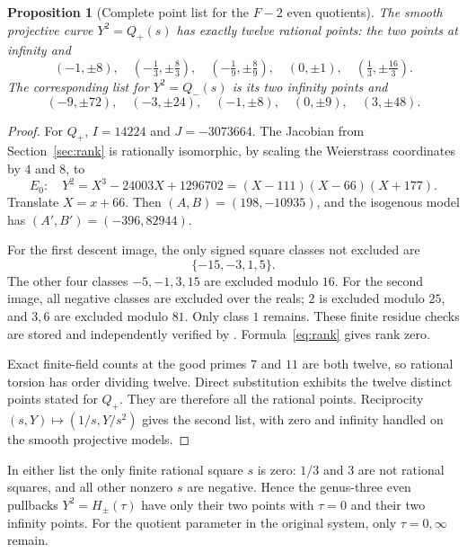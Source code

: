 \documentclass[11pt,letterpaper]{article}
\newtheorem{proposition}[theorem]{Proposition}
\theoremstyle{definition}\newtheorem{definition}[theorem]{Definition}
\theoremstyle{remark}\newtheorem{remark}[theorem]{Remark}
\begin{document}
\begin{proposition}[Complete point list for the $F{-}2$ even quotients]\label{prop:f2points}
The smooth projective curve $Y^2=Q_+(s)$ has exactly twelve rational points: the two points at infinity and
\[
(-1,\pm8),\quad
\left(-\tfrac13,\pm\tfrac83\right),\quad
\left(-\tfrac19,\pm\tfrac89\right),\quad
(0,\pm1),\quad
\left(\tfrac13,\pm\tfrac{16}3\right).
\]
The corresponding list for $Y^2=Q_-(s)$ is its two infinity points and
\[
(-9,\pm72),\quad(-3,\pm24),\quad(-1,\pm8),\quad
(0,\pm9),\quad(3,\pm48).
\]
\end{proposition}
\begin{proof}
For $Q_+$, $I=14224$ and $J=-3073664$. The Jacobian from Section~\ref{sec:rank} is rationally isomorphic, by scaling the Weierstrass coordinates by $4$ and $8$, to
\begin{equation}\label{eq:F2E}
E_0:\quad Y^2=X^3-24003X+1296702
=(X-111)(X-66)(X+177).
\end{equation}
Translate $X=x+66$. Then $(A,B)=(198,-10935)$, and the isogenous model has $(A',B')=(-396,82944)$.

For the first descent image, the only signed square classes not excluded are
\[
\{-15,-3,1,5\}.
\]
The other four classes $-5,-1,3,15$ are excluded modulo $16$. For the second image, all negative classes are excluded over the reals; $2$ is excluded modulo $25$, and $3,6$ are excluded modulo $81$. Only class $1$ remains. These finite residue checks are stored and independently verified by . Formula~\eqref{eq:rank} gives rank zero.

Exact finite-field counts at the good primes $7$ and $11$ are both twelve, so rational torsion has order dividing twelve. Direct substitution exhibits the twelve distinct points stated for $Q_+$. They are therefore all the rational points. Reciprocity $(s,Y)\mapsto(1/s,Y/s^2)$ gives the second list, with zero and infinity handled on the smooth projective models.
\end{proof}

In either list the only finite rational square $s$ is zero: $1/3$ and $3$ are not rational squares, and all other nonzero $s$ are negative. Hence the genus-three even pullbacks $Y^2=H_\pm(\tau)$ have only their two points with $\tau=0$ and their two infinity points. For the quotient parameter in the original system, only $\tau=0,\infty$ remain.
\end{document}

